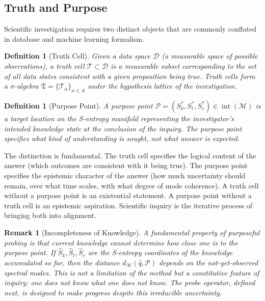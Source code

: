 \documentclass[10pt,twocolumn]{article}
\newtheorem{definition}[theorem]{Definition}
\newtheorem{remark}[theorem]{Remark}
\DeclareMathOperator{\interior}{int}
\newcommand{\TruthCell}{\mathcal{T}}
\newcommand{\PurposePoint}{\mathcal{P}}
\newcommand{\DataSpace}{\mathcal{D}}
\newcommand{\ManifoldM}{\mathcal{M}}
\begin{document}
\subsection{Truth and Purpose}

Scientific investigation requires two distinct objects that are
commonly conflated in database and machine learning formalism.

\begin{definition}[Truth Cell]
\label{def:truth-cell}
Given a data space $\DataSpace$ (a measurable space of possible observations),
a \emph{truth cell} $\TruthCell \subset \DataSpace$ is a measurable subset
corresponding to the set of all data states consistent with a given
proposition being true. Truth cells form a $\sigma$-algebra
$\mathfrak{T} = \{\TruthCell_\alpha\}_{\alpha \in A}$ under the
hypothesis lattice of the investigation.
\end{definition}

\begin{definition}[Purpose Point]
\label{def:purpose-point}
A \emph{purpose point} $\PurposePoint = (S_k^*, S_t^*, S_e^*)
\in \interior(\ManifoldM)$ is a target location on the S-entropy manifold
representing the investigator's intended knowledge state at the conclusion
of the inquiry. The purpose point specifies \emph{what kind of understanding}
is sought, not \emph{what answer} is expected.
\end{definition}

The distinction is fundamental. The truth cell specifies the logical
content of the answer (which outcomes are consistent with it being true).
The purpose point specifies the epistemic character of the answer
(how much uncertainty should remain, over what time scales,
with what degree of mode coherence).
A truth cell without a purpose point is an existential statement.
A purpose point without a truth cell is an epistemic aspiration.
Scientific inquiry is the iterative process of bringing both into alignment.

\begin{remark}[Incompleteness of Knowledge]
\label{rem:incompleteness}
A fundamental property of purposeful probing is that current knowledge
cannot determine how close one is to the purpose point.
If $\hat{S}_k, \hat{S}_t, \hat{S}_e$ are the S-entropy coordinates
of the knowledge accumulated so far, then the distance $d_\ManifoldM(\hat{q}, \PurposePoint)$
depends on the \emph{not-yet-observed} spectral modes.
This is not a limitation of the method but a constitutive feature of inquiry:
one does not know what one does not know.
The probe operator, defined next, is designed to make progress
despite this irreducible uncertainty.
\end{remark}
\end{document}
